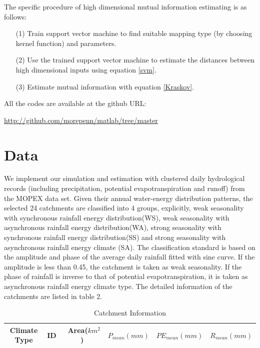 \documentclass[draft,wrr]{AGUTeX}
\begin{document}
\begin{article}
The specific procedure of high dimensional mutual information estimating is as follows:
\begin{enumerate}
\item [(1)]Train support vector machine to find suitable mapping type (by choosing kernel function) and parameters.
\item [(2)]Use the trained support vector machine to estimate the distances between high dimensional inputs using equation \ref{svm}.
\item [(3)]Estimate mutual information with equation \ref{Kraskov}.
\end{enumerate}

 
All the codes are available at the github URL: 

\underline{http://github.com/morepenn/matlab/tree/master}
 
\section{Data}
We implement our simulation and estimation with clustered daily hydrological records (including precipitation, potential evapotranspiration and runoff) from the MOPEX data set\citep{duan2006model}. Given their annual water-energy distribution patterns, the selected 24 catchments are classified into 4 groups, explicitly, weak seasonality with synchronous rainfall energy distribution(WS), weak seasonality with asynchronous rainfall energy distribution(WA), strong seasonality with  synchronous rainfall energy distribution(SS) and strong seasonality with asynchronous rainfall energy climate (SA). The classification standard is based on the amplitude and phase of the average daily rainfall fitted with sine curve. If the amplitude is less than 0.45, the catchment is taken as weak seasonality. If the phase of rainfall is inverse to that of potential evapotranspiration, it is taken as asynchronous rainfall energy climate type. The detailed information of the catchments are listed in table 2. 
 
\begin{table}\scriptsize
\caption{Catchment Information} 
 
\begin{tabular}{cccccc}
\hline
Climate Type& ID &\ Area($km^2$)& $P_{mean}(mm)$& $PE_{mean}(mm)$&  $R_{mean}(mm)$  \\
\hline
 

\end{tabular}
\end{table}
\end{article}
\end{document}

